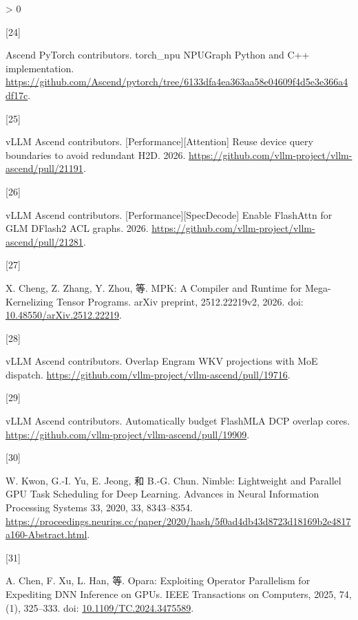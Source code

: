 \documentclass[
  UTF8,
  zihao=5]{ctexart}
\newlength{\cslhangindent}
\newlength{\csllabelwidth}
\newenvironment{CSLReferences}[2] %
 {%
  \setlength{\parindent}{0pt}
  \ifodd #1 \everypar{\setlength{\hangindent}{\cslhangindent}}\ignorespaces\fi
  \ifnum #2 > 0
  \setlength{\parskip}{#2\baselineskip}
  \fi
 }%
 {}
\newcommand{\CSLLeftMargin}[1]{\parbox[t]{\csllabelwidth}{#1}}
\newcommand{\CSLRightInline}[1]{\parbox[t]{\linewidth - \csllabelwidth}{#1}\par}
\begin{document}
\begin{CSLReferences}{0}{0}
\leavevmode{}%
\CSLLeftMargin{{[}24{]} }%
\CSLRightInline{Ascend PyTorch contributors. {torch\_npu NPUGraph Python
and C++ implementation}.
\url{https://github.com/Ascend/pytorch/tree/6133dfa4ea363aa58e04609f4d5e3e366a4df17c}.}

\leavevmode{}%
\CSLLeftMargin{{[}25{]} }%
\CSLRightInline{vLLM Ascend contributors.
{{[}Performance{]}{[}Attention{]} Reuse device query boundaries to avoid
redundant H2D}. 2026.
\url{https://github.com/vllm-project/vllm-ascend/pull/21191}.}

\leavevmode{}%
\CSLLeftMargin{{[}26{]} }%
\CSLRightInline{vLLM Ascend contributors.
{{[}Performance{]}{[}SpecDecode{]} Enable FlashAttn for GLM DFlash2 ACL
graphs}. 2026.
\url{https://github.com/vllm-project/vllm-ascend/pull/21281}.}

\leavevmode{}%
\CSLLeftMargin{{[}27{]} }%
\CSLRightInline{X. Cheng, Z. Zhang, Y. Zhou, 等. MPK: A Compiler and
Runtime for Mega-Kernelizing Tensor Programs. arXiv preprint,
2512.22219v2, 2026. doi:
\href{https://doi.org/10.48550/arXiv.2512.22219}{10.48550/arXiv.2512.22219}.}

\leavevmode{}%
\CSLLeftMargin{{[}28{]} }%
\CSLRightInline{vLLM Ascend contributors. {Overlap Engram WKV
projections with MoE dispatch}.
\url{https://github.com/vllm-project/vllm-ascend/pull/19716}.}

\leavevmode{}%
\CSLLeftMargin{{[}29{]} }%
\CSLRightInline{vLLM Ascend contributors. {Automatically budget FlashMLA
DCP overlap cores}.
\url{https://github.com/vllm-project/vllm-ascend/pull/19909}.}

\leavevmode{}%
\CSLLeftMargin{{[}30{]} }%
\CSLRightInline{W. Kwon, G.-I. Yu, E. Jeong, 和 B.-G. Chun. Nimble:
Lightweight and Parallel GPU Task Scheduling for Deep Learning. Advances
in Neural Information Processing Systems 33, 2020, 33, 8343--8354.
\url{https://proceedings.neurips.cc/paper/2020/hash/5f0ad4db43d8723d18169b2e4817a160-Abstract.html}.}

\leavevmode{}%
\CSLLeftMargin{{[}31{]} }%
\CSLRightInline{A. Chen, F. Xu, L. Han, 等. Opara: Exploiting Operator
Parallelism for Expediting DNN Inference on GPUs. IEEE Transactions on
Computers, 2025, 74, (1), 325--333. doi:
\href{https://doi.org/10.1109/TC.2024.3475589}{10.1109/TC.2024.3475589}.}


\end{CSLReferences}
\end{document}
